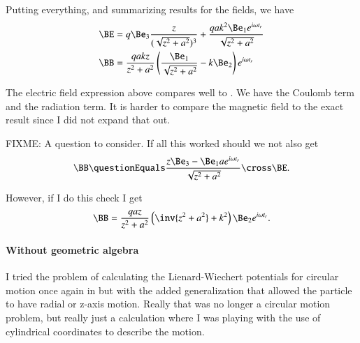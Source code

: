 {Putting everything, and summarizing results for the fields, we have
%
\begin{equation}\label{eqn:relativisticElectrodynamicsExamReflection:250}
\begin{aligned}
\BE &=
q \Be_3 \frac{z}{(\sqrt{z^2 + a^2})^3}
+
\frac{q a k^2 \Be_1 e^{i \omega t_r} }{\sqrt{z^2 + a^2}} \\
\BB
&= \frac{q a k z}{ z^2 + a^2} \left( \frac{\Be_1}{\sqrt{z^2 + a^2}} - k \Be_2 \right) e^{i \omega t_r}
\end{aligned}
\end{equation}

The electric field expression above compares well to .  We have the Coulomb term and the radiation term.  It is harder to compare the magnetic field to the exact result  since I did not expand that out.

FIXME: A question to consider.  If all this worked should we not also get
%
\begin{equation}\label{eqn:relativisticElectrodynamicsExamReflection:270}
\BB
\questionEquals
\frac{z \Be_3 - \Be_1 a e^{i \omega t_r}}{\sqrt{z^2 + a^2}} \cross \BE.
\end{equation}

However, if I do this check I get
%
\begin{equation}\label{eqn:relativisticElectrodynamicsExamReflection:290}
\BB
=
\frac{q a z}{z^2 + a^2} \left( \inv{z^2 + a^2} + k^2 \right) \Be_2 e^{i \omega t_r}.
\end{equation}


\paragraph{Without geometric algebra}

I tried the problem of calculating the Lienard-Wiechert potentials for circular motion once again in \citep{gabookII:matrixVectorPotentials} but with the added generalization that allowed the particle to have radial or z-axis motion.  Really that was no longer a circular motion problem, but really just a calculation where I was playing with the use of cylindrical coordinates to describe the motion.

}

